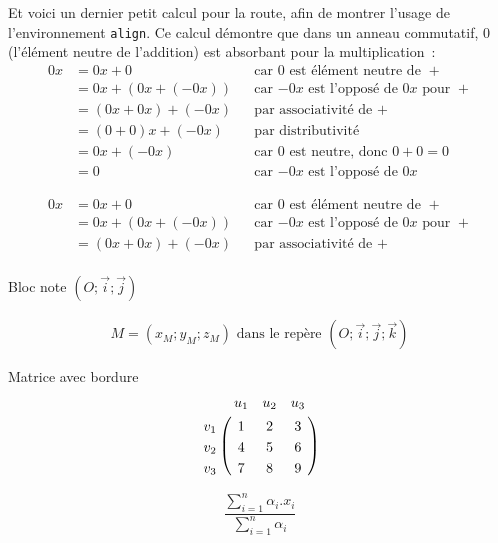 \documentclass{article}
\begin{document}
Et voici un dernier petit calcul pour la route, afin de montrer l'usage de
l'environnement \texttt{align}. %
Ce calcul démontre que dans un anneau commutatif, $0$ (l'élément neutre de
l'addition) est absorbant pour la multiplication~:
\begin{align*}
  0x  &= 0x + 0            && \text{car $0$ est élément neutre de $+$}\\
      &= 0x + (0x + (-0x)) && \text{car $-0x$ est l'opposé de $0x$ pour $+$}\\
      &= (0x + 0x) + (-0x) && \text{par associativité de $+$}\\
      &= (0 + 0)x + (-0x)  && \text{par distributivité}\\
      &= 0x + (-0x)        && \text{car $0$ est neutre, donc $0+0=0$}\\
      &= 0                 && \text{car $-0x$ est l'opposé de $0x$}
\end{align*}

\begin{align*}
	0x  &= 0x + 0            && \text{car $0$ est élément neutre de $+$}\\
	&= 0x + (0x + (-0x)) && \text{car $-0x$ est l'opposé de $0x$ pour $+$}\\
	&= (0x + 0x) + (-0x) && \text{par associativité de $+$}\\
\end{align*}

Bloc note 
$(O;\vec{i};\vec{j})$


\begin{eqnarray}
	M = (x_{M};y_{M};z_{M}) \text{ dans le repère } (O;\vec{i};\vec{j};\vec{k})
\end{eqnarray}

Matrice avec bordure
\begin{eqnarray*}
\bordermatrix{
	& u_1 & u_2 & u_3\\
	v_1 & 1 & 2 & 3\\
	v_2 & 4 & 5 & 6\\
	v_3 & 7 & 8 & 9
}
\end{eqnarray*}

$$
\frac{\sum\limits_{i=1}^n\alpha_{i}.x_{i}}{\sum\limits_{i=1}^n\alpha_{i}}
$$
\end{document}
